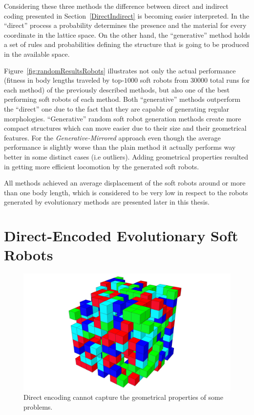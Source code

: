 Considering these three methods the difference between direct and indirect coding presented in Section~\ref{DirectIndirect} is becoming easier interpreted. In the ``direct'' process a probability determines the presence and the material for every coordinate in the lattice space. On the other hand, the ``generative'' method holds a set of rules and probabilities defining the structure that is going to be produced in the available space.

Figure~\ref{fig:randomResultsRobots} illustrates not only the actual performance (fitness in body lengths traveled by top-$1000$ soft robots from $30000$ total runs for each method) of the previously described methods, but also one of the best performing soft robots of each method. Both ``generative'' methods outperform the ``direct'' one due to the fact that they are capable of generating regular morphologies. ``Generative'' random soft robot generation methods create more compact structures which can move easier due to their size and their geometrical features. For the \textit{Generative-Mirrored} approach even though the average performance is slightly worse than the plain method it actually performs way better in some distinct cases (i.e outliers). Adding geometrical properties resulted in getting more efficient locomotion by the generated soft robots.

All methods achieved an average displacement of the soft robots around or more than one body length, which is considered to be very low in respect to the robots generated by evolutionary methods are presented later in this thesis.

\section{Direct-Encoded Evolutionary Soft Robots}
\label{DirectEncodingEvolution}

\begin{figure}
\centering
\includegraphics[height=0.2\textheight]{../Figures/Robots/direct.jpg}
\caption{Direct encoding cannot capture the geometrical properties of some problems.}
\label{fig:directRobot}
\end{figure}

